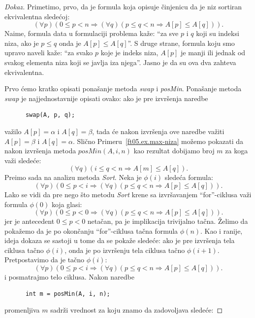 \begin{proof}[Dokaz]
  Primetimo, prvo, da je formula koja opisuje \v cinjenicu da je niz sortiran ekvivalentna slede\'coj:
  $$
    (\forall p)(0 \le p < n \Rightarrow (\forall q)(p \le q < n \Rightarrow A[p] \le A[q])).
  $$
  Naime, formula data u formulaciji problema ka\v ze: ``za sve $p$ i $q$ koji su indeksi niza, ako je $p \le q$ onda je $A[p] \le A[q]$''.
  S druge strane, formula koju smo upravo naveli ka\v ze: ``za svako $p$ koje je indeks niza, $A[p]$ je manji ili jednak od svakog elementa
  niza koji se javlja iza njega''. Jasno je da su ova dva zahteva ekvivalentna.

  Prvo \'cemo kratko opisati pona\v sanje metoda \textit{swap} i \textit{posMin}. Pona\v sanje metoda \textit{swap} je
  najjednostavnije opisati ovako: ako je pre izvr\v senja naredbe
{\small
\begin{verbatim}
      swap(A, p, q);
\end{verbatim}
}
  \noindent
  va\v zilo $A[p] = \alpha$ i $A[q] = \beta$, tada \'ce nakon izvr\v senja ove naredbe va\v ziti
  $A[p] = \beta$ i $A[q] = \alpha$.
  Sli\v cno Primeru~\ref{ft05.ex.max-niza} mo\v zemo pokazati da nakon izvr\v senja metoda $\mathit{posMin}(A, i, n)$
  kao rezultat dobijamo broj $m$ za koga va\v zi slede\'ce:
  $$
    (\forall q)(i \le q < n \Rightarrow A[m] \le A[q]).
  $$
  Pre\dj imo sada na analizu metoda \textit{Sort}. Neka je $\phi(i)$ slede\'ca formula:
  $$
    (\forall p)(0 \le p < i \Rightarrow (\forall q)(p \le q < n \Rightarrow A[p] \le A[q])).
  $$
  Lako se vidi da pre nego \v sto metodu \textit{Sort} krene sa izvr\v savanjem ``for''-ciklusa
  va\v zi formula $\phi(0)$ koja glasi:
  $$
    (\forall p)(0 \le p < 0 \Rightarrow (\forall q)(p \le q < n \Rightarrow A[p] \le A[q])).
  $$
  jer je antecedent $0 \le p < 0$ neta\v can, pa je implikacija trivijalno ta\v cna.
  \v Zelimo da poka\v zemo da je po okon\v canju ``for''-ciklusa ta\v cna formula $\phi(n)$. Kao i ranije,
  ideja dokaza se sastoji u tome da se poka\v ze slede\'ce: ako je pre izvr\v senja tela ciklusa ta\v cno $\phi(i)$,
  onda je po izvr\v senju tela ciklusa ta\v cno $\phi(i + 1)$. Pretpostavimo da je ta\v cno $\phi(i)$:
  $$
    (\forall p)(0 \le p < i \Rightarrow (\forall q)(p \le q < n \Rightarrow A[p] \le A[q])).
  $$
  i posmatrajmo telo ciklusa. Nakon naredbe
{\small
\begin{verbatim}
      int m = posMin(A, i, n);
\end{verbatim}
}
\noindent
  promenljiva $m$ sadr\v zi vrednost za koju znamo da zadovoljava slede\'ce:

\end{proof}
